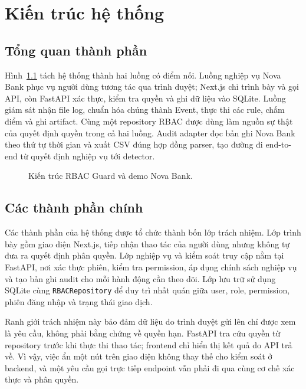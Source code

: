 \chapter{Kiến trúc hệ thống}
\label{chap:architecture}

\section{Tổng quan thành phần}

Hình~\ref{fig:architecture} tách hệ thống thành hai luồng có điểm nối. Luồng nghiệp vụ
Nova Bank phục vụ người dùng tương tác qua trình duyệt; Next.js chỉ trình bày
và gọi API, còn FastAPI xác thực, kiểm tra quyền và ghi dữ liệu vào SQLite.
Luồng giám sát nhận file log, chuẩn hóa chúng thành Event, thực thi các rule,
chấm điểm và ghi artifact. Cùng một repository RBAC được dùng làm nguồn sự
thật của quyết định quyền trong cả hai luồng. Audit adapter đọc bản ghi Nova
Bank theo thứ tự thời gian và xuất CSV đúng hợp đồng parser, tạo đường đi
end-to-end từ quyết định nghiệp vụ tới detector.

\begin{figure}[htbp]
\centering
\resizebox{\textwidth}{!}{}
\caption{Kiến trúc RBAC Guard và demo Nova Bank.}
\label{fig:architecture}
\end{figure}

\section{Các thành phần chính}

Các thành phần của hệ thống được tổ chức thành bốn lớp trách nhiệm. Lớp trình
bày gồm giao diện Next.js, tiếp nhận thao tác của người dùng nhưng không tự đưa
ra quyết định phân quyền. Lớp nghiệp vụ và kiểm soát truy cập nằm tại FastAPI,
nơi xác thực phiên, kiểm tra permission, áp dụng chính sách nghiệp vụ và tạo
bản ghi audit cho mỗi hành động cần theo dõi. Lớp lưu trữ sử dụng SQLite cùng
\texttt{RBACRepository} để duy trì nhất quán giữa user, role, permission, phiên
đăng nhập và trạng thái giao dịch.

Ranh giới trách nhiệm này bảo đảm dữ liệu do trình duyệt gửi lên chỉ được xem
là yêu cầu, không phải bằng chứng về quyền hạn. FastAPI tra cứu quyền từ
repository trước khi thực thi thao tác; frontend chỉ hiển thị kết quả do API
trả về. Vì vậy, việc ẩn một nút trên giao diện không thay thế cho kiểm soát ở
backend, và một yêu cầu gọi trực tiếp endpoint vẫn phải đi qua cùng cơ chế xác
thực và phân quyền.


